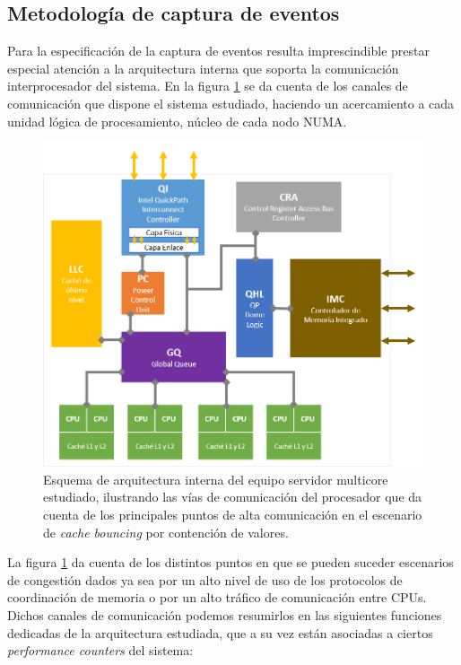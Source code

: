 \subsection{Metodología de captura de eventos}
Para la especificación de la captura de eventos resulta imprescindible prestar especial atención a la arquitectura interna que soporta la comunicación interprocesador del sistema. En la figura \ref{fig:hwcomm} se da cuenta de los canales de comunicación que dispone el sistema estudiado, haciendo un acercamiento a cada unidad lógica de procesamiento, núcleo de cada nodo NUMA.

\begin{figure}[!h]
	\centering
	\includegraphics[scale=.8]{imagenes/QuickPathChannels.png}
	\caption{Esquema de arquitectura interna del equipo servidor multicore estudiado, ilustrando las vías de comunicación del procesador que da cuenta de los principales puntos de alta comunicación en el escenario de \textit{cache bouncing} por contención de valores.}
	\label{fig:hwcomm}
\end{figure}

La figura \ref{fig:hwcomm} da cuenta de los distintos puntos en que se pueden suceder escenarios de congestión dados ya sea por un alto nivel de uso de los protocolos de coordinación de memoria o por un alto tráfico de comunicación entre CPUs. Dichos canales de comunicación podemos resumirlos en las siguientes funciones dedicadas de la arquitectura estudiada, que a su vez están asociadas a ciertos \emph{performance counters} del sistema:

